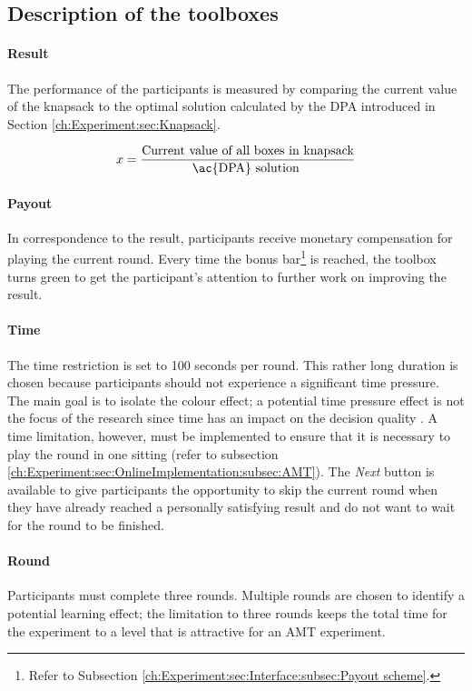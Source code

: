 \subsection{Description of the toolboxes}

\paragraph{Result}

The performance of the participants is measured by comparing the current value of the knapsack to the optimal solution calculated by the \ac{DPA} introduced in Section \ref{ch:Experiment:sec:Knapsack}.
  
\begin{equation}
x = \dfrac{\text{Current value of all boxes in knapsack}}{\text{\ac{DPA} solution }}
\label{eq:x}
\end{equation}

\paragraph{Payout}

In correspondence to the result, participants receive monetary compensation for playing the current round. Every time the bonus bar\footnote{Refer to Subsection \ref{ch:Experiment:sec:Interface:subsec:Payout scheme}.} is reached, the toolbox turns green to get the participant's attention to further work on improving the result.

\paragraph{Time}
The time restriction is set to 100 seconds per round. This rather long duration is chosen because participants should not experience a significant time pressure. The main goal is to isolate the colour effect; a potential time pressure effect is not the focus of the research since time has an impact on the decision quality \citep{Hahn2006}. A time limitation, however, must be implemented to ensure that it is necessary to play the round in one sitting (refer to subsection  \ref{ch:Experiment:sec:OnlineImplementation:subsec:AMT}).
The \textit{Next} button is available to give participants the opportunity to skip the current round when they have already reached a personally satisfying result and do not want to wait for the round to be finished.
\paragraph{Round}
Participants must complete three rounds. Multiple rounds are chosen to identify a potential learning effect; the limitation to three rounds keeps the total time for the experiment to a level that is attractive for an \acf{AMT} experiment. 


